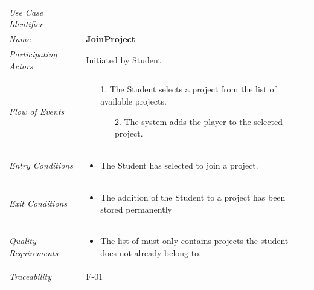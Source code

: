 \documentclass[12pt,letterpaper]{article}
\begin{document}
\begin{center}
	\begin{tabu} to 
		\toprule
		Use Case Identifier & \joinproject{} \\
		Name & {\bf JoinProject} \\
		Participating Actors & Initiated by Student \\
		Flow of Events & 
	    \begin{enumerate}[topsep=-1em, leftmargin=*]
		    \item[1.] The Student selects a project from the list of available projects.
		    \begin{enumerate}
		    		\item[2.] The system adds the player to the selected project.
		    \end{enumerate}
		\end{enumerate} \\

		Entry Conditions &
		\begin{itemize}[topsep=-1em, leftmargin=*]
		    \item The Student has selected to join a project.
        \end{itemize} \\

		Exit Conditions &
		\begin{itemize}[topsep=-1em, leftmargin=*]
		    \item The addition of the Student to a project has been stored permanently
        \end{itemize} \\

		Quality Requirements &
		\begin{itemize}[topsep=-1em, leftmargin=*]
		    \item The list of must only contains projects the student does not already belong to.
        \end{itemize} \\

		Traceability & F-01 \\
		\toprule
	\end{tabu}
\end{center}
\end{document}
